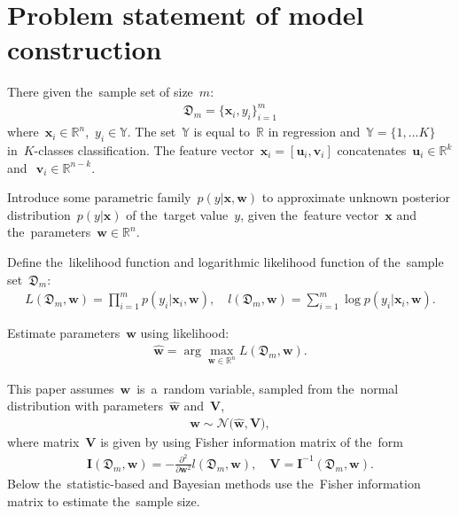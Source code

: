 \documentclass[
11pt,%
tightenlines,%
twoside,%
onecolumn,%
nofloats,%
nobibnotes,%
nofootinbib,%
superscriptaddress,%
noshowpacs,%
centertags]%
{revtex4}
\begin{document}
\section{Problem statement of model construction}
There given the~sample set of size~$m$:
\[
\label{eq:ps:1}
\begin{aligned}
    \mathfrak{D}_{m} = \{\mathbf{x}_i, y_i\}_{i = 1}^{m}
\end{aligned}
\]
where~$\mathbf{x}_i\in \mathbb{R}^{n}$,~$y_i\in \mathbb{Y}$. The
set~$\mathbb{Y}$ is equal to~$\mathbb{R}$ in regression
and~$\mathbb{Y}=\{1,\dots K\}$ in~$K$-classes classification. The
feature vector~$\mathbf{x}_{i} = [\mathbf{u}_{i}, \mathbf{v}_{i}]$
concatenates~$\mathbf{u}_i\in \mathbb{R}^{k}$ and~$~\mathbf{v}_i\in
\mathbb{R}^{n-k}$.

Introduce some parametric family~$p(y|\mathbf{x}, \mathbf{w})$ to
approximate  unknown posterior distribution~$p(y|\mathbf{x})$ of
the~target value~$y$, given the~feature vector~$\mathbf{x}$ and
the~parameters~$\mathbf{w}\in \mathbb{R}^{n}$.

Define the~likelihood function and logarithmic likelihood function of the~sample set~$\mathfrak{D}_{m}$:
\begin{equation}
\label{eq:ps:4}
\begin{aligned}
    L\left(\mathfrak{D}_{m}, \mathbf{w}\right) = \prod_{i=1}^{m} p\left(y_{i}|\mathbf{x}_{i},
    \mathbf{w}\right),\quad l\left(\mathfrak{D}_{m}, \mathbf{w}\right) = \sum_{i=1}^{m} \log p\left(y_i|\mathbf{x}_{i}, \mathbf{w}\right).
\end{aligned}
\end{equation}

Estimate parameters~$\mathbf{w}$ using likelihood:
\[
\label{eq:ps:5}
\begin{aligned}
    \hat{\mathbf{w}} = \arg\max_{\mathbf{w}\in\mathbb{R}^{n}}L\left(\mathfrak{D}_{m}, \mathbf{w}\right).
\end{aligned}
\]

This paper assumes~$\mathbf{w}$~is~a~random variable, sampled from the~normal distribution with parameters~$\hat{\mathbf{w}}$ and~$\mathbf{V}$,
\[
\label{eq:ps:5'}
\begin{aligned}
 \mathbf{w} \sim \mathcal{N}\bigr(\hat{\mathbf{w}}, \mathbf{V}\bigr),
\end{aligned}
\]
where matrix~$\mathbf{V}$ is given by using Fisher information matrix of the~form
\[
\label{eq:ps:6}
\begin{aligned}
    \mathbf{I}\left(\mathfrak{D}_{m}, \mathbf{w}\right) = -\frac{\partial^2}{\partial \mathbf{w}^{2}}l\left(\mathfrak{D}_{m}, \mathbf{w}\right), \quad \mathbf{V} = \mathbf{I}^{-1}\left(\mathfrak{D}_{m}, \mathbf{w}\right).
\end{aligned}
\]
Below the~statistic-based and Bayesian methods use the~Fisher information matrix to estimate the~sample size.
\end{document}
